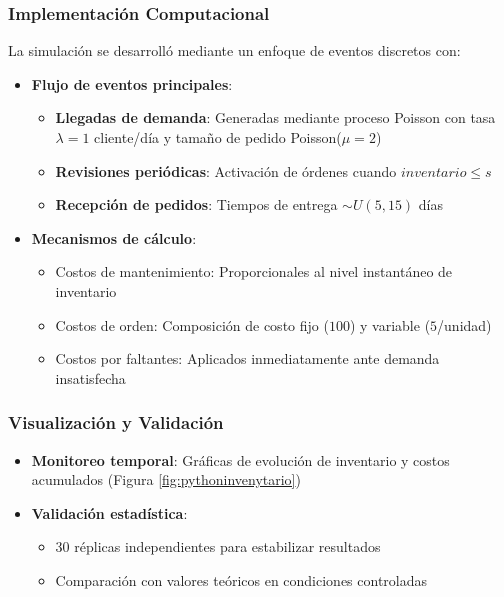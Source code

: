 \documentclass{article}
\begin{document}
\subsubsection{Implementación Computacional}


La simulación se desarrolló mediante un enfoque de eventos discretos con:


\begin{itemize}
    \item \textbf{Flujo de eventos principales}:
    \begin{itemize}
        \item \textbf{Llegadas de demanda}: Generadas mediante proceso Poisson con tasa $\lambda=1$ cliente/día y tamaño de pedido Poisson($\mu=2$)
        \item \textbf{Revisiones periódicas}: Activación de órdenes cuando $inventario \leq s$
        \item \textbf{Recepción de pedidos}: Tiempos de entrega $\sim U(5,15)$ días
    \end{itemize}
   
    \item \textbf{Mecanismos de cálculo}:
    \begin{itemize}
        \item Costos de mantenimiento: Proporcionales al nivel instantáneo de inventario
        \item Costos de orden: Composición de costo fijo ($100$) y variable ($5$/unidad)
        \item Costos por faltantes: Aplicados inmediatamente ante demanda insatisfecha
    \end{itemize}
\end{itemize}


\subsubsection{Visualización y Validación}


\begin{itemize}
    \item \textbf{Monitoreo temporal}: Gráficas de evolución de inventario y costos acumulados (Figura \ref{fig:pythoninvenytario})
    \item \textbf{Validación estadística}:
    \begin{itemize}
        \item 30 réplicas independientes para estabilizar resultados
        \item Comparación con valores teóricos en condiciones controladas
    \end{itemize}
\end{itemize}
\end{document}
